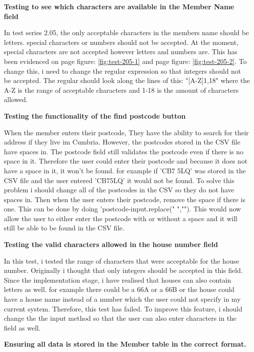 \textbf{Testing to see which characters are available in the Member Name field}

In test series 2.05, the only acceptable characters in the members name should be letters. special characters or numbers should not be accepted. At the moment, special characters are not accepted however letters and numbers are. This has been evidenced on page \pageref{fig:test-205-1} figure: \ref{fig:test-205-1}  and page \pageref{fig:test-205-2} figure: \ref{fig:test-205-2}. To change this, i need to change the regular expression so that integers should not be accepted. The regular should look along the lines of this: "[A-Z]{1,18}" where the A-Z is the range  of acceptable characters and 1-18 is the amount of characters allowed. 


\textbf{Testing the functionality of the find postcode button}

When the member enters their postcode, They have the ability to search for their address if they live im Cumbria. However, the postcodes stored in the CSV file have spaces in. The postcode field still validates the postcode even if there is no space in it. Therefore the user could enter their postcode and because it does not have a space in it, it won't be found. for example if 'CB7 5LQ' was stored in the CSV file and the user entered 'CB75LQ' it would not be found. To solve this problem i should change all of the postcodes in the CSV so they do not have spaces in. Then when the user enters their postcode, remove the space if there is one. This can be done by doing 'postcode-input.replace(" ",""). This would now allow the user to either enter the postcode with or without a space and it will still be able to be found in the CSV file.

\textbf{Testing the valid characters allowed in the house number field}

In this test, i tested the range of characters that were acceptable for the house number. Originally i thought that only integers should be accepted in this field. Since the implementation stage, i have realised that houses can also contain letters as well. for example there could be a 66A or a 66B or the house could have a house name instead of a number which the user could not specify in my current system. Therefore,  this test has failed. To improve this feature, i should change the the input method so that the user can also enter characters in the field as well.

\textbf{Ensuring all data is stored in the Member table in the correct format.}

